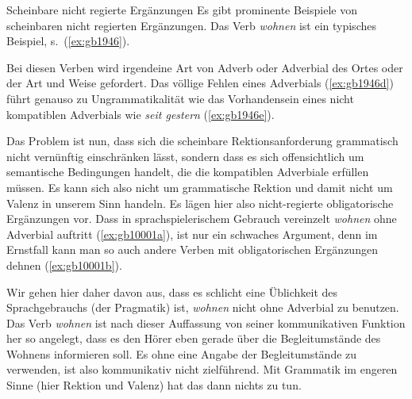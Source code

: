 \begin{Vertiefung}{Scheinbare nicht regierte Ergänzungen}
  \label{vert:nregerg}
\noindent Es gibt prominente Beispiele von scheinbaren nicht regierten Ergänzungen.
Das Verb \textit{wohnen} ist ein typisches Beispiel, s.\ (\ref{ex:gb1946}).

\begin{exe}
  \ex\label{ex:gb1946}
  \begin{xlist}
  \end{xlist}
\end{exe}

Bei diesen Verben wird irgendeine Art von Adverb oder Adverbial des Ortes oder der Art und Weise gefordert.
Das völlige Fehlen eines Adverbials (\ref{ex:gb1946d}) führt genauso zu Ungrammatikalität wie das Vorhandensein eines nicht kompatiblen Adverbials wie \textit{seit gestern} (\ref{ex:gb1946e}).

Das Problem ist nun, dass sich die scheinbare Rektionsanforderung grammatisch nicht vernünftig einschränken lässt, sondern dass es sich offensichtlich um semantische Bedingungen handelt, die die kompatiblen Adverbiale erfüllen müssen.
Es kann sich also nicht um grammatische Rektion und damit nicht um Valenz in unserem Sinn handeln.
Es lägen hier also nicht-regierte obligatorische Ergänzungen vor.
Dass in sprachspielerischem Gebrauch vereinzelt \textit{wohnen} ohne Adverbial auftritt (\ref{ex:gb10001a}), ist nur ein schwaches Argument, denn im Ernstfall kann man so auch andere Verben mit obligatorischen Ergänzungen dehnen (\ref{ex:gb10001b}).


\begin{exe}
  \ex\label{ex:gb10001}
  \begin{xlist}
  \end{xlist}
\end{exe}

Wir gehen hier daher davon aus, dass es schlicht eine Üblichkeit des Sprachgebrauchs (der Pragmatik) ist, \textit{wohnen} nicht ohne Adverbial zu benutzen.
Das Verb \textit{wohnen} ist nach dieser Auffassung von seiner kommunikativen Funktion her so angelegt, dass es den Hörer eben gerade über die Begleitumstände des Wohnens informieren soll.
Es ohne eine Angabe der Begleitumstände zu verwenden, ist also kommunikativ nicht zielführend.
Mit Grammatik im engeren Sinne (hier Rektion und Valenz) hat das dann nichts zu tun.

\end{Vertiefung}

